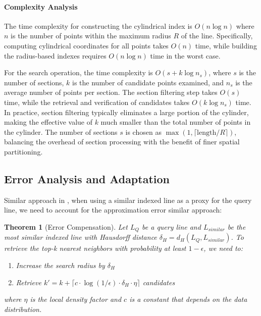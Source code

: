 \documentclass[numbers,sort]{article}
\newtheorem{theorem}{Theorem}
\begin{document}
\paragraph{Complexity Analysis} The time complexity for constructing the cylindrical index is $O(n \log n)$ where $n$ is the number of points within the maximum radius $R$ of the line. Specifically, computing cylindrical coordinates for all points takes $O(n)$ time, while building the radius-based indexes requires $O(n \log n)$ time in the worst case.

For the search operation, the time complexity is $O(s + k \log n_s)$, where $s$ is the number of sections, $k$ is the number of candidate points examined, and $n_s$ is the average number of points per section. The section filtering step takes $O(s)$ time, while the retrieval and verification of candidates takes $O(k \log n_s)$ time. In practice, section filtering typically eliminates a large portion of the cylinder, making the effective value of $k$ much smaller than the total number of points in the cylinder. The number of sections $s$ is chosen as $\max(1, \lceil \text{length} / R \rceil)$, balancing the overhead of section processing with the benefit of finer spatial partitioning.

\subsection{Error Analysis and Adaptation}

Similar approach in \cite{foster2018inference,heidari2020approximate,heidariapproximate}, when using a similar indexed line as a proxy for the query line, we need to account for the approximation error similar approach:

\begin{theorem}[Error Compensation]
\label{thm:error-compensation}
Let $L_Q$ be a query line and $L_{similar}$ be the most similar indexed line with Hausdorff distance $\delta_H = d_H(L_Q, L_{similar})$. To retrieve the top-k nearest neighbors with probability at least $1-\epsilon$, we need to:
\begin{enumerate}
\item Increase the search radius by $\delta_H$
\item Retrieve $k' = k + \lceil c \cdot \log(1/\epsilon) \cdot \delta_H \cdot \eta \rceil$ candidates
\end{enumerate}
where $\eta$ is the local density factor and $c$ is a constant that depends on the data distribution.
\end{theorem}
\end{document}
